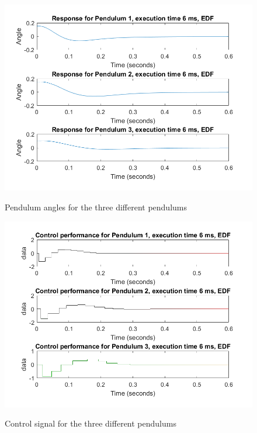 \documentclass[12pt,a4paper]{article}
\begin{document}
\subsection{} %
\begin{center}
	\begin{figure}
	\includegraphics[scale=0.5]{ex61.png}
	\label{fig:ex61}
	\caption{Pendulum angles for the three different pendulums}
	\end{figure}
\end{center}
\begin{center}
	\begin{figure}
	\includegraphics[scale=0.5]{ex62.png}
	\label{fig:ex62}
	\caption{Control signal  for the three different pendulums}
	\end{figure}
\end{center}
\end{document}

